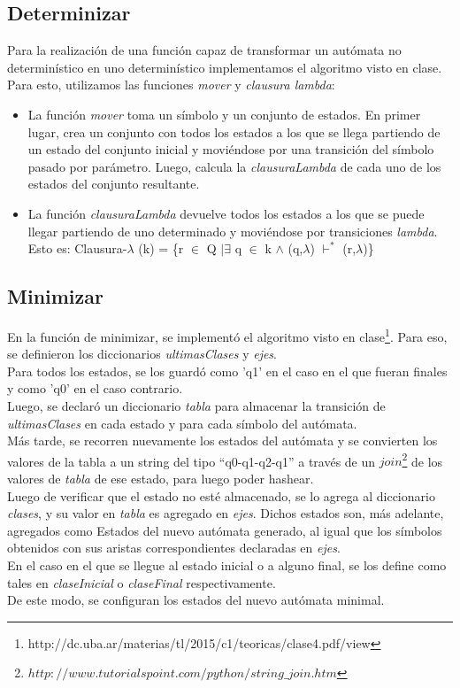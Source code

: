 \documentclass[a4paper, 10pt, twoside]{article}
\begin{document}
\subsection{Determinizar}
Para la realización de una función capaz de transformar un autómata no determinístico en uno determinístico implementamos el algoritmo visto en clase. Para esto, utilizamos las funciones \textit{mover} y \textit{clausura lambda}:
\begin{itemize}
\item La función \textit{mover} toma un símbolo y un conjunto de estados. En primer lugar, crea un conjunto con todos los estados a los que se llega partiendo de un estado del conjunto inicial y moviéndose por una transición del símbolo pasado por parámetro. Luego, calcula la \textit{clausuraLambda} de cada uno de los estados del conjunto resultante.
\item La función \textit{clausuraLambda} devuelve todos los estados a los que se puede llegar partiendo de uno determinado y moviéndose por transiciones \textit{lambda}. Esto es:
Clausura-$\lambda$ (k) = \{r $\in$ Q $| \exists$ q $\in$ k $\land$ (q,$\lambda$) $\vdash^{*}$ (r,$\lambda$)\}
\end{itemize}

\subsection{Minimizar}
En la función de minimizar, se implementó el algoritmo visto en clase\footnote{http://dc.uba.ar/materias/tl/2015/c1/teoricas/clase4.pdf/view}. Para eso, se definieron los diccionarios \textit{ultimasClases} y \textit{ejes}.\\
Para todos los estados, se los guardó como 'q1' en el caso en el que fueran finales y como 'q0' en el caso contrario.\\
Luego, se declaró un diccionario \textit{tabla} para almacenar la transición de \textit{ultimasClases} en cada estado y para cada símbolo del autómata.\\
Más tarde, se recorren nuevamente los estados del autómata y se convierten los valores de la tabla a un string del tipo ``q0-q1-q2-q1'' a través de un $join$\footnote{$http://www.tutorialspoint.com/python/string\_join.htm$} de los valores de \textit{tabla} de ese estado, para luego poder hashear.\\
Luego de verificar que el estado no esté almacenado, se lo agrega al diccionario \textit{clases}, y su valor en \textit{tabla} es agregado en \textit{ejes}. Dichos estados son, más adelante, agregados como Estados del nuevo autómata generado, al igual que los símbolos obtenidos con sus aristas correspondientes declaradas en \textit{ejes}.\\
En el caso en el que se llegue al estado inicial o a alguno final, se los define como tales en \textit{claseInicial} o \textit{claseFinal} respectivamente.\\
De este modo, se configuran los estados del nuevo autómata minimal.
\end{document}
